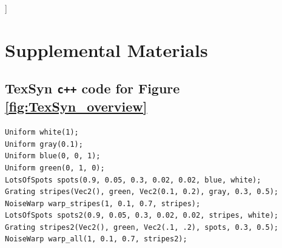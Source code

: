 \documentclass[sigconf]{acmart}
\begin{document}
\begin{acks}
\par
[... I've been working on this on and off since 2007, based on inspirations by papers in the early 1990s (Witkin/Kass, Turk, Angeline/Pollack, Sims) ...]
\par
[maybe just names (roughly backward in time): 
Ken Perlin,
Aaron Hertzmann,
Andrew Glassner,
Pat Hanrahan,
Karl Sims,
John Koza,
Richard Dawkins,
Witkin/Kass/Turk,
Peter Angeline,
Jordan Pollack.
and of course, Alan Turing. [too weird/maudlin? QQQ]
]
\end{acks}






\newpage
\appendix
\section{Supplemental Materials}
\subsection{TexSyn \texttt{c++} code for Figure \ref{fig:TexSyn_overview}}
\begin{small}
\begin{verbatim}
Uniform white(1);
Uniform gray(0.1);
Uniform blue(0, 0, 1);
Uniform green(0, 1, 0);
LotsOfSpots spots(0.9, 0.05, 0.3, 0.02, 0.02, blue, white);
Grating stripes(Vec2(), green, Vec2(0.1, 0.2), gray, 0.3, 0.5);
NoiseWarp warp_stripes(1, 0.1, 0.7, stripes);
LotsOfSpots spots2(0.9, 0.05, 0.3, 0.02, 0.02, stripes, white);
Grating stripes2(Vec2(), green, Vec2(.1, .2), spots, 0.3, 0.5);
NoiseWarp warp_all(1, 0.1, 0.7, stripes2);
\end{verbatim}
\end{small}


\end{document}
